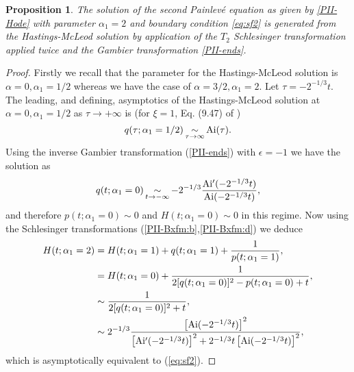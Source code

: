 \documentclass[10pt,reqno]{amsart}
\theoremstyle{plain}
\newtheorem{proposition}{Proposition}
\theoremstyle{definition}
\theoremstyle{remark}
\begin{document}
\begin{proposition}  \label{prop:notcorollary}
The solution of the second Painlev\'e equation as given by \eqref{PII-Hode} with parameter $ \alpha_1=2 $ 
and boundary condition \eqref{eq:sf2} is generated from the Hastings-McLeod solution by application of the
$ T_2 $ Schlesinger transformation applied twice and the Gambier transformation \eqref{PII-ends}.
\end{proposition}
\begin{proof}    
Firstly we recall that the parameter for the Hastings-McLeod solution is $ \alpha=0, \alpha_1=1/2 $
whereas we have the case of $ \alpha=3/2, \alpha_1=2 $.
Let $ \tau=-2^{-1/3}t $. The leading, and defining, asymptotics of the Hastings-McLeod solution at 
$ \alpha=0, \alpha_1=1/2 $ as $ \tau\to +\infty $ is (for $ \xi=1 $, Eq. (9.47) of \cite{rmt_Fo})
\begin{equation*}
   q(\tau;\alpha_1=1/2) \mathop{\sim}\limits_{\tau \to \infty} {\rm Ai}(\tau) .
\end{equation*} 
Using the inverse Gambier transformation (\ref{PII-ends}) with $ \epsilon=-1 $ we have the solution as
\begin{equation*}
   q(t;\alpha_1=0) \mathop{\sim}\limits_{t \to -\infty} -2^{-1/3}\frac{{\rm Ai'}(-2^{-1/3}t)}{{\rm Ai}(-2^{-1/3}t)} ,
\end{equation*} 
and therefore $ p(t;\alpha_1=0) \sim 0 $ and $ H(t;\alpha_1=0) \sim 0 $ in this regime. Now using the 
Schlesinger transformations (\ref{PII-Bxfm:b},\ref{PII-Bxfm:d}) we deduce
\begin{align*}
  H(t;\alpha_1=2) & = H(t;\alpha_1=1)+q(t;\alpha_1=1)+\frac{1}{p(t;\alpha_1=1)} ,
\\
   & = H(t;\alpha_1=0)+\frac{1}{2[q(t;\alpha_1=0)]^2-p(t;\alpha_1=0)+t} ,
\\
   & \sim \frac{1}{2[q(t;\alpha_1=0)]^2+t} ,
\\
   & \sim 2^{-1/3}\frac{\left[ {\rm Ai}(-2^{-1/3}t) \right]^2}{\left[ {\rm Ai'}(-2^{-1/3}t) \right]^2+2^{-1/3}t\left[ {\rm Ai}(-2^{-1/3}t) \right]^2} ,
\end{align*}
which is asymptotically equivalent to (\ref{eq:sf2}).
\end{proof}



\nopagebreak
\end{document}
